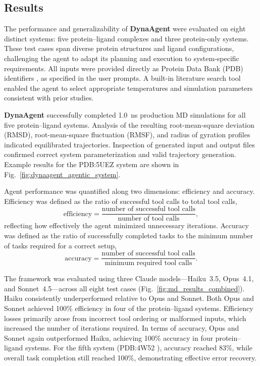 \subsection*{Results}

The performance and generalizability of \textbf{DynaAgent} were evaluated on eight distinct systems: five protein–ligand complexes and three protein-only systems. These test cases span diverse protein structures and ligand configurations, challenging the agent to adapt its planning and execution to system-specific requirements. All inputs were provided directly as Protein Data Bank (PDB) identifiers \cite{burley2025updated}, as specified in the user prompts. A built-in literature search tool enabled the agent to select appropriate temperatures and simulation parameters consistent with prior studies.

\textbf{DynaAgent} successfully completed 1.0~ns production MD simulations for all five protein–ligand systems. Analysis of the resulting root-mean-square deviation (RMSD), root-mean-square fluctuation (RMSF), and radius of gyration profiles indicated equilibrated trajectories. Inspection of generated input and output files confirmed correct system parameterization and valid trajectory generation. Example results for the PDB:5UEZ system are shown in Fig.~\ref{fig:dynaagent_agentic_system}.

Agent performance was quantified along two dimensions: efficiency and accuracy. Efficiency was defined as the ratio of successful tool calls to total tool calls,
\[
\text{efficiency} = \frac{\text{number of successful tool calls}}{\text{number of tool calls}},
\]
reflecting how effectively the agent minimized unnecessary iterations. Accuracy was defined as the ratio of successfully completed tasks to the minimum number of tasks required for a correct setup,
\[
\text{accuracy} = \frac{\text{number of successful tool calls}}{\text{minimum required tool calls}}.
\]

The framework was evaluated using three Claude models—Haiku~3.5, Opus~4.1, and Sonnet~4.5—across all eight test cases (Fig.~\ref{fig:md_results_combined}). Haiku consistently underperformed relative to Opus and Sonnet. Both Opus and Sonnet achieved 100\% efficiency in four of the protein–ligand systems. Efficiency losses primarily arose from incorrect tool ordering or malformed inputs, which increased the number of iterations required. In terms of accuracy, Opus and Sonnet again outperformed Haiku, achieving 100\% accuracy in four protein–ligand systems. For the fifth system (PDB:4W52 \cite{merski2015homologous}), accuracy reached 83\%, while overall task completion still reached 100\%, demonstrating effective error recovery.

